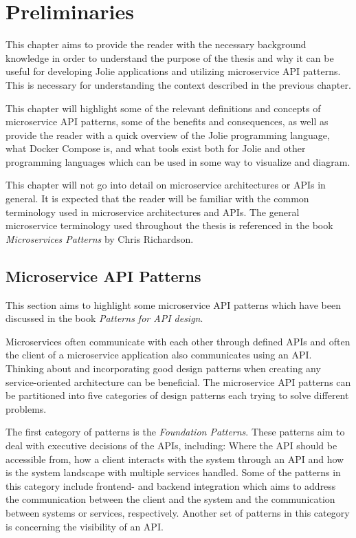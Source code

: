 \chapter{Preliminaries}
This chapter aims to provide the reader with the necessary background knowledge 
in order
to understand the purpose of the thesis and why it can be useful for developing Jolie applications and utilizing
microservice API patterns. This is necessary for understanding the context described in the previous chapter.

This chapter will highlight some of the relevant definitions and concepts of microservice API patterns, some of the benefits and consequences, as
 well as provide
the reader with a quick overview of the Jolie programming language,
what Docker Compose is, and what tools exist both for Jolie and
other programming languages which can be used in some way to visualize and diagram.

This chapter will not go into detail on microservice architectures or APIs in general. It is
expected that the reader will be familiar with the common terminology used in microservice architectures and APIs.
The general microservice terminology used throughout the thesis is referenced in the book \textit{Microservices Patterns} by Chris Richardson.\cite{microservicepatterns}

\section{Microservice API Patterns}
This section aims to highlight some microservice API patterns which have been discussed in the book \textit{Patterns for API design}.\cite{PatternsForAPIDesign:2022}

Microservices often communicate with each other through defined APIs and often the client of a microservice application also communicates using an API.
Thinking about and incorporating good design patterns when creating any service-oriented architecture can be beneficial.
The microservice API patterns can be partitioned into five categories of design patterns each trying to solve different problems.

The first category of patterns is the \textit{Foundation Patterns}. These patterns aim to deal with executive decisions of the APIs, including: Where the API should be
accessible from, how a client interacts with the system through an API and how is the system landscape with multiple services handled. Some of the patterns in this category include frontend- and backend integration which aims
to address the communication between the client and the system and the communication between systems or services, respectively. Another set of patterns in this category is concerning the visibility of an API.

